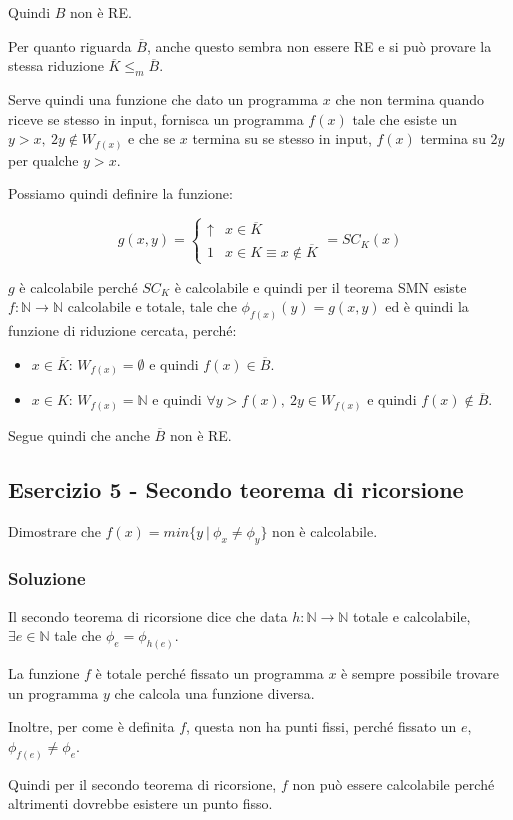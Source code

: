 Quindi $B$ non è RE.

Per quanto riguarda $\overline{B}$, anche questo sembra non essere RE e si può provare la stessa riduzione $\overline{K} \leq_m \overline{B}$.

Serve quindi una funzione che dato un programma $x$ che non termina quando riceve se stesso in input, fornisca un programma $f(x)$ tale che esiste un $y > x, \: 2y \notin W_{f(x)}$ e che se $x$ termina su se stesso in input, $f(x)$ termina su $2y$ per qualche $y > x$.

Possiamo quindi definire la funzione:

$$
g(x,y) = \begin{cases}
\uparrow &x \in \overline{K} \\
1 &x \in K \equiv x \notin\overline{K}
\end{cases} = SC_K(x) 
$$

$g$ è calcolabile perché $SC_K$ è calcolabile e quindi per il teorema SMN esiste $f : \mathbb{N} \rightarrow \mathbb{N}$ calcolabile e totale, tale che $\phi_{f(x)}(y) = g(x,y)$ ed è quindi la funzione di riduzione cercata, perché:

\begin{itemize}
	\item $x \in \overline{K}$: $W_{f(x)} = \emptyset$ e quindi $f(x) \in \overline{B}$.
	\item $x \in K$: $W_{f(x)} = \mathbb{N}$ e quindi $\forall y > f(x), \: 2y \in W_{f(x)}$ e quindi $f(x) \notin \overline{B}$. 
\end{itemize}

Segue quindi che anche $\overline{B}$ non è RE.

\subsection{Esercizio 5 - Secondo teorema di ricorsione}

Dimostrare che $f(x) = min \{ y \: | \: \phi_x \neq \phi_y  \}$ non è calcolabile.

\subsubsection{Soluzione}

Il secondo teorema di ricorsione dice che data $h : \mathbb{N} \rightarrow \mathbb{N}$ totale e calcolabile, $\exists e \in \mathbb{N}$ tale che $\phi_e = \phi_{h(e)}$.

La funzione $f$ è totale perché fissato un programma $x$ è sempre possibile trovare un programma $y$ che calcola una funzione diversa.

Inoltre, per come è definita $f$, questa non ha punti fissi, perché fissato un $e$, $\phi_{f(e)} \neq \phi_e$.

Quindi per il secondo teorema di ricorsione, $f$ non può essere calcolabile perché altrimenti dovrebbe esistere un punto fisso.

